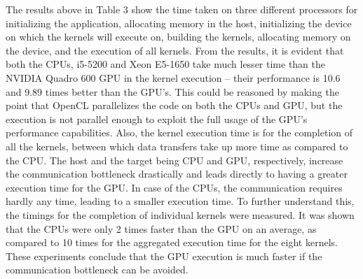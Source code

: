 The results above in Table 3 show the time taken on three different processors for initializing the application, allocating memory in the host, initializing the device on which the kernels will execute on, building the kernels, allocating memory on the device, and the execution of all kernels. \newline\newline
From the results, it is evident that both the CPUs, i5-5200 and Xeon E5-1650 take much lesser time than the NVIDIA Quadro 600 GPU in the kernel execution – their performance is 10.6 and 9.89 times better than the GPU’s. This could be reasoned by making the point that OpenCL parallelizes the code on both the CPUs and GPU, but the execution is not parallel enough to exploit the full usage of the GPU’s performance capabilities. Also, the kernel execution time is for the completion of all the kernels, between which data transfers take up more time as compared to the CPU. The host and the target being CPU and GPU, respectively, increase the communication bottleneck drastically and leads directly to having a greater execution time for the GPU. In case of the CPUs, the communication requires hardly any time, leading to a smaller execution time. \newline\newline
To further understand this, the timings for the completion of individual kernels were measured. It was shown that the CPUs were only 2 times faster than the GPU on an average, as compared to 10 times for the aggregated execution time for the eight kernels. These experiments conclude that the GPU execution is much faster if the communication bottleneck can be avoided. \newline\newline